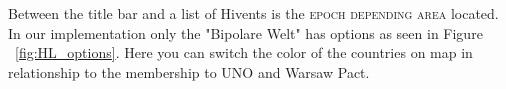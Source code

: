 Between the title bar and a list of Hivents is the \textsc{epoch depending area} located. In our implementation only the "Bipolare Welt" has options as seen in Figure ~\ref{fig:HL_options}. Here you can switch the color of the countries on map in relationship to the membership to UNO and Warsaw Pact.


